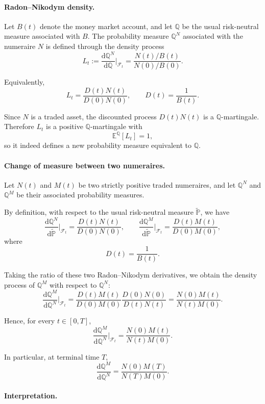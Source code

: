 \documentclass[11pt]{article}
\newcommand{\F}{\mathcal{F}}
\newcommand{\Qbb}{\mathbb{Q}}
\newcommand{\E}{\mathbb{E}}
\theoremstyle{definition}
\theoremstyle{plain}
\begin{document}
\paragraph{Radon--Nikodym density.}
Let \(B(t)\) denote the money market account, and let \(\Qbb\) be the
usual risk-neutral measure associated with \(B\).
The probability measure \(\Qbb^N\) associated with the numeraire \(N\)
is defined through the density process
\[
L_t
:=
\frac{\mathrm{d}\Qbb^N}{\mathrm{d}\Qbb}\Big|_{\mathcal{F}_t}
=
\frac{N(t)/B(t)}{N(0)/B(0)}.
\]

Equivalently,
\[
L_t
=
\frac{D(t)N(t)}{D(0)N(0)},
\qquad D(t)=\frac1{B(t)}.
\]

Since \(N\) is a traded asset, the discounted process \(D(t)N(t)\) is a
\(\Qbb\)-martingale.
Therefore \(L_t\) is a positive \(\Qbb\)-martingale with
\[
\E^\Qbb[L_t]=1,
\]
so it indeed defines a new probability measure equivalent to \(\Qbb\).

\paragraph{Change of measure between two numeraires.}

Let \(N(t)\) and \(M(t)\) be two strictly positive traded numeraires, and
let \(\Qbb^N\) and \(\Qbb^M\) be their associated probability measures.

By definition, with respect to the usual risk-neutral measure
\(\widetilde{\mathbb P}\), we have
\[
\frac{\mathrm{d}\Qbb^N}{\mathrm{d}\widetilde{\mathbb P}}\Big|_{\F_t}
=
\frac{D(t)N(t)}{D(0)N(0)},
\qquad
\frac{\mathrm{d}\Qbb^M}{\mathrm{d}\widetilde{\mathbb P}}\Big|_{\F_t}
=
\frac{D(t)M(t)}{D(0)M(0)},
\]
where
\[
D(t)=\frac1{B(t)}.
\]

Taking the ratio of these two Radon--Nikodym derivatives, we obtain the
density process of \(\Qbb^M\) with respect to \(\Qbb^N\):
\[
\frac{\mathrm{d}\Qbb^M}{\mathrm{d}\Qbb^N}\Big|_{\F_t}
=
\frac{D(t)M(t)}{D(0)M(0)}
\frac{D(0)N(0)}{D(t)N(t)}
=
\frac{N(0)M(t)}{N(t)M(0)}.
\]

Hence, for every \(t\in[0,T]\),
\[
\boxed{
\frac{\mathrm{d}\Qbb^M}{\mathrm{d}\Qbb^N}\Big|_{\F_t}
=
\frac{N(0)M(t)}{N(t)M(0)}.
}
\]

In particular, at terminal time \(T\),
\[
\boxed{
\frac{\mathrm{d}\Qbb^M}{\mathrm{d}\Qbb^N}
=
\frac{N(0)M(T)}{N(T)M(0)}.
}
\]

\paragraph{Interpretation.}
\end{document}

